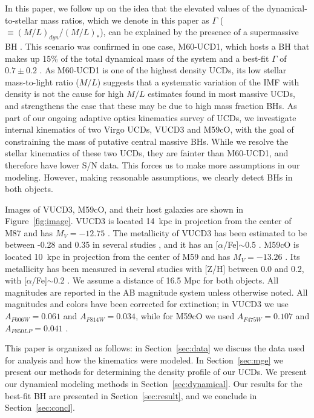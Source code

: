 \documentclass{aastex}
\begin{document}
In this paper, we follow up on the idea that the elevated values of the dynamical-to-stellar mass ratios, which we denote in this paper as $\Gamma$ ($\equiv (M/L)_{dyn} / (M/L)_{*}$), can be explained by the presence of a supermassive BH \citep{mieske13}. This scenario was confirmed in one case, M60-UCD1, which hosts a BH that makes up 15\% of the total dynamical mass of the system and a best-fit $\Gamma$ of $0.7\pm0.2$ \citep{seth14}.  As M60-UCD1 is one of the highest density UCDs, its low stellar mass-to-light ratio ($M/L$) suggests that a systematic variation of the IMF with density is not the cause for high $M/L$ estimates found in most massive UCDs, and strengthens the case that these may be due to high mass fraction BHs. As part of our ongoing adaptive optics kinematics survey of UCDs, we investigate internal kinematics of two Virgo UCDs, VUCD3 and M59cO, with the goal of constraining the mass of putative central massive BHs.  While we resolve the stellar kinematics of these two UCDs, they are fainter than M60-UCD1, and therefore have lower S/N data. This forces us to make more assumptions in our modeling. However, making reasonable assumptions, we clearly detect BHs in both objects.

Images of VUCD3, M59cO, and their host galaxies are shown in Figure~\ref{fig:image}.  VUCD3 is located 14~kpc in projection from the center of M87 and has $M_V = -12.75$ \citep{mieske13}.  The metallicity of VUCD3 has been estimated to be between -0.28 and 0.35 in several studies \citep{evstigneeva07,firth09,francis12}, and it has an [$\alpha$/Fe]$\sim$0.5 \citep{francis12}.  M59cO is located 10~kpc in projection from the center of M59 and has $M_V = -13.26$ \citep{mieske13}.  Its metallicity has been measured in several studies with [Z/H] between 0.0 and 0.2, with [$\alpha$/Fe]$\sim$0.2 \citep{chilingarianmamon08,sandoval15,janz16}.  We assume a distance of 16.5 Mpc for both objects.  All magnitudes are reported in the AB magnitude system unless otherwise noted.  All magnitudes and colors have been corrected for extinction; in VUCD3 we use $A_{F606W} = 0.061$ and $A_{F814W} = 0.034$, while for M59cO we used $A_{F475W} = 0.107$ and $A_{F850LP} = 0.041$ \citep{schlafly11}.

This paper is organized as follows: in Section~\ref{sec:data} we discuss the data used for analysis and how the kinematics were modeled. In Section~\ref{sec:mge} we present our methods for determining the density profile of our UCDs. We present our dynamical modeling methods in Section~\ref{sec:dynamical}. Our results for the best-fit BH are presented in Section~\ref{sec:result}, and we conclude in Section~\ref{sec:concl}. \\  
\end{document}
